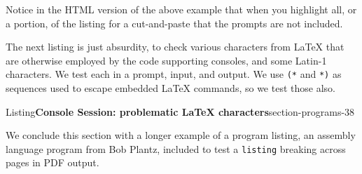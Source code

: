 \documentclass{amsart}
\theoremstyle{plain}%
\theoremstyle{definition}%
\theoremstyle{remark}%
\newcommand{\mono}[1]{\texttt{#1}}
\numberwithin{equation}{section}
\newcommand{\consoleinput}[1]{\textbf{#1}}
\begin{document}
Notice in the HTML version of the above example that when you highlight all, or a portion, of the listing for a cut-and-paste that the prompts are not included.%
\par
The next listing is just absurdity, to check various characters from \LaTeX{} that are otherwise employed by the code supporting consoles, and some Latin-1 characters.  We test each in a prompt, input, and output.  We use \mono{(*} and \mono{*)} as sequences used to escape embedded \LaTeX{} commands, so we test those also.%
\begin{listingptx}{Listing}{\textbf{Console Session: problematic \LaTeX{} characters}}{section-programs-38}{}%
\begin{console}{0}{1}{0}
A backslash \ here  (*\consoleinput{A backslash \textbackslash{} here}*)
A backslash \ here
A begin group { here  (*\consoleinput{A begin group \{ here}*)
A begin group { here
An end group { here  (*\consoleinput{An end group \} here}*)
An end group } here
An open escape sequence (*({}**) here  (*\consoleinput{An open escape sequence ({}*{} here}*)
An open escape sequence (*({}**) here
An end escape sequence (**{})*) here  (*\consoleinput{An end escape sequence *{}){} here}*)
An end escape sequence (**{})*) here
Some quotation marks ` ' " here  (*\consoleinput{Some quotation marks \textasciigrave{} \textquotesingle{} \textquotedbl{} here}*)
Some quotation marks ` ' " here
The rest & %
The rest & %
Latin-1: ÆÇÈÉÊËÌÍÎÏÐÑÒÓÔÕÖ×ØÙÚÛÜÝÞß  (*\consoleinput{Latin-1: ÆÇÈÉÊËÌÍÎÏÐÑÒÓÔÕÖ×ØÙÚÛÜÝÞß}*)
Latin-1: ÆÇÈÉÊËÌÍÎÏÐÑÒÓÔÕÖ×ØÙÚÛÜÝÞß
\end{console}
\end{listingptx}%
We conclude this section with a longer example of a program listing, an assembly language program from Bob Plantz, included to test a \mono{listing} breaking across pages in PDF output.%
\end{document}

